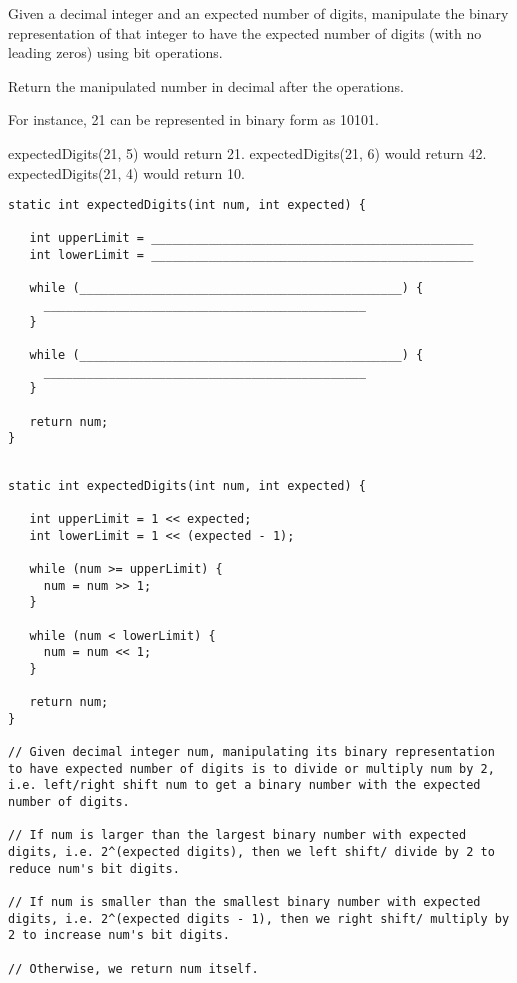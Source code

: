 
\question Given a decimal integer and an expected number of digits, manipulate the binary representation of that integer to have the expected number of digits (with no leading zeros) using bit operations.

Return the manipulated number in decimal after the operations.

For instance, 21 can be represented in binary form as 10101.

expectedDigits(21, 5) would return 21. \newline 
expectedDigits(21, 6) would return 42. \newline
expectedDigits(21, 4) would return 10. 

\ifprintanswers\else
\begin{lstlisting}
static int expectedDigits(int num, int expected) {

   int upperLimit = _____________________________________________
   int lowerLimit = _____________________________________________
   
   while (_____________________________________________) {
     _____________________________________________
   }
 
   while (_____________________________________________) {
     _____________________________________________
   }
   
   return num;
}

\end{lstlisting}
\fi

\begin{solution}
\begin{lstlisting}

static int expectedDigits(int num, int expected) {

   int upperLimit = 1 << expected;
   int lowerLimit = 1 << (expected - 1);
   
   while (num >= upperLimit) {
     num = num >> 1;
   }
 
   while (num < lowerLimit) {
     num = num << 1;
   }
   
   return num;
}

// Given decimal integer num, manipulating its binary representation to have expected number of digits is to divide or multiply num by 2, i.e. left/right shift num to get a binary number with the expected number of digits. 

// If num is larger than the largest binary number with expected digits, i.e. 2^(expected digits), then we left shift/ divide by 2 to reduce num's bit digits.

// If num is smaller than the smallest binary number with expected digits, i.e. 2^(expected digits - 1), then we right shift/ multiply by 2 to increase num's bit digits.

// Otherwise, we return num itself. 


\end{lstlisting}
\end{solution}